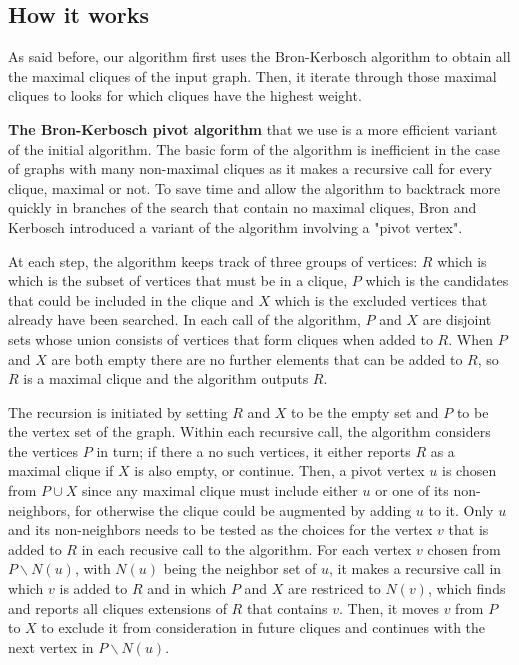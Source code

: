 \subsection{How it works}

As said before, our algorithm first uses the Bron-Kerbosch algorithm to obtain
all the maximal cliques of the input graph. Then, it iterate through those maximal
cliques to looks for which cliques have the highest weight. \newline

\textbf{The Bron-Kerbosch pivot algorithm} that we use is a more efficient variant
of the initial algorithm. The basic form of the algorithm is inefficient in the
case of graphs with many non-maximal cliques as it makes a recursive call for
every clique, maximal or not. To save time and allow the algorithm to backtrack
more quickly in branches of the search that contain no maximal cliques, Bron and
Kerbosch introduced a variant of the algorithm involving a "pivot vertex". \newline

At each step, the algorithm keeps track of three groups of vertices: $R$ which is
which is the subset of vertices that must be in a clique, $P$ which is the candidates
that could be included in the clique and $X$ which is the excluded vertices that
already have been searched. In each call of the algorithm, $P$ and $X$ are disjoint
sets whose union consists of vertices that form cliques when added to $R$.
When $P$ and $X$ are both empty there are no further elements that can be added
to $R$, so $R$ is a maximal clique and the algorithm outputs $R$. \newline

The recursion is initiated by setting $R$ and $X$ to be the empty set and $P$ to
be the vertex set of the graph. Within each recursive call, the algorithm considers
the vertices $P$ in turn; if there a no such vertices, it either reports $R$ as
a maximal clique if $X$ is also empty, or continue. Then, a pivot vertex $u$ is
chosen from $P\cup X$ since any maximal clique must include either $u$ or one of
its non-neighbors, for otherwise the clique could be augmented by adding $u$ to it.
Only $u$ and its non-neighbors needs to be tested as the choices for the vertex
$v$ that is added to $R$ in each recusive call to the algorithm. For each vertex
$v$ chosen from $P\backslash N(u)$, with $N(u)$ being the neighbor set of $u$,
it makes a recursive call in which $v$ is added to $R$ and in which $P$ and $X$
are restriced to $N(v)$, which finds and reports all cliques extensions of $R$
that contains $v$. Then, it moves $v$ from $P$ to $X$ to exclude it from consideration
in future cliques and continues with the next vertex in $P\backslash N(u)$. \newline

